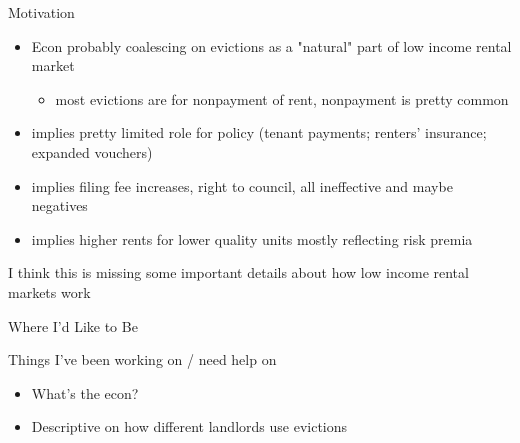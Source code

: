 \documentclass[10pt, xcolor=dvipsnames]{beamer}
\begin{document}
\begin{frame}{Motivation}
    \begin{itemize}
        \item Econ probably coalescing on evictions as a "natural" part of low income rental market
        \begin{itemize}
            \item most evictions are for nonpayment of rent, nonpayment is pretty common
        \end{itemize}
        \item implies pretty limited role for policy (tenant payments; renters' insurance; expanded vouchers)
        \item implies filing fee increases, right to council, all ineffective and maybe negatives
        \item implies higher rents for lower quality units mostly reflecting risk premia
    \end{itemize}

    I think this is missing some important details about how low income rental markets work
\end{frame}

\begin{frame}{Where I'd Like to Be}
    
\end{frame}

\begin{frame}{Things I've been working on / need help on}
\begin{itemize}
    \item What's the econ?
    \item Descriptive on how different landlords use evictions
\end{itemize}
    
\end{frame}
\end{document}
